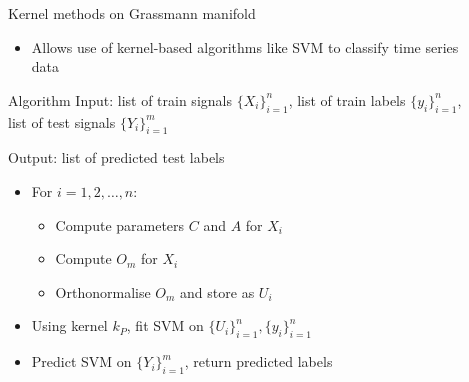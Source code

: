 \documentclass[final]{beamer}
\newlength{\sepwid}
\newlength{\onecolwid}
\begin{document}
\begin{frame}[t]
\begin{columns}[t]
\begin{column}{\onecolwid}
\begin{block}{Kernel methods on Grassmann manifold}
\begin{itemize}
            where $[Y_i]$ is the subspace spanned by the columns of $Y_i$, $Y_1$ and $Y_2$ are
            matrices with orthonormal columns, and $\gamma$ is a hyperparameter
        
        \item Allows use of kernel-based algorithms like SVM to classify time series data
    \end{itemize}
\end{block}


\begin{block}{Algorithm}
    Input: list of train signals $\{X_i\}_{i=1}^n$, list of train labels $\{y_i\}_{i=1}^n$, list of
    test signals $\{Y_i\}_{i=1}^m$

    Output: list of predicted test labels
    \begin{itemize}
        \item For $i = 1, 2, \dots, n$:

            \begin{itemize}
                \item Compute parameters $C$ and $A$ for $X_i$
                \item Compute $O_m$ for $X_i$
                \item Orthonormalise $O_m$ and store as $U_i$
            \end{itemize}

        \item Using kernel $k_P$, fit SVM on $\{U_i\}_{i=1}^n, \{y_i\}_{i=1}^n$

        \item Predict SVM on $\{Y_i\}_{i=1}^m$, return predicted labels
    \end{itemize}
\end{block}


\end{column} %

\begin{column}{\sepwid}\end{column} %

\begin{column}{\onecolwid} %


\end{column}
\end{columns}
\end{frame}
\end{document}
